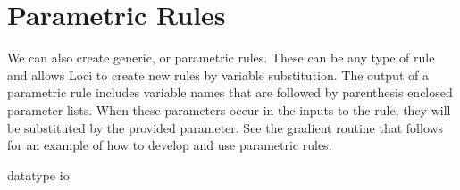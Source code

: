 \documentclass[10pt,epsf]{book}
\begin{document}


\section{Parametric Rules}

We can also create generic, or parametric rules.  These can be any
type of rule and allows Loci to create new rules by variable
substitution.  The output of a parametric rule includes variable names
that are followed by parenthesis enclosed parameter lists.  When these
parameters occur in the inputs to the rule, they will be substituted
by the provided parameter.  See the gradient routine that follows for
an example of how to develop and use parametric rules.




 {datatype}
 {io}
\end{document}
